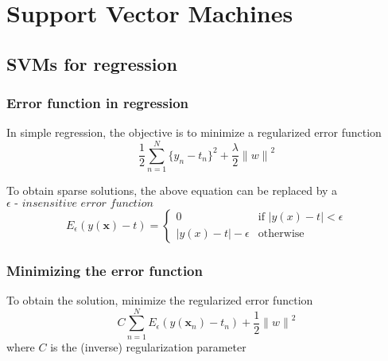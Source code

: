 \documentclass[t,14pt]{beamer}
\date[Introduction]{Support Vector Machines}
\begin{document}
\begin{frame}
  \titlepage
\end{frame}

\section{Support Vector Machines}


\subsection{SVMs for regression}

\begin{frame}
  \frametitle{Error function in regression}
  In simple regression, the objective is to minimize a regularized error 
  function
  \begin{equation}
    \frac{\displaystyle 1}{\displaystyle 2}
        \sum\limits_{n=1}^N \{y_n - t_n\}^2 + 
        \frac{\displaystyle \lambda}{\displaystyle 2}{\lVert w \rVert}^2
  \end{equation}

  To obtain sparse solutions, the above equation can be replaced by a 
  $\epsilon \textit{ - insensitive error function}$
  \begin{equation}
    E_\epsilon(y(\mathbf{x}) - t) = 
        \begin{cases}
            0 & \text{if } \lvert y(x) - t \rvert < \epsilon \\
            \lvert y(x) - t \rvert - \epsilon & \text{otherwise}
        \end{cases}
  \end{equation}
\end{frame}

\begin{frame}
  \frametitle{Minimizing the error function}
  To obtain the solution, minimize the regularized error function
  \begin{equation}
    C \sum\limits_{n=1}^N E_\epsilon(y(\mathbf{x}_n) - t_n) + 
      \frac{\displaystyle 1}{\displaystyle 2}{\lVert w \rVert}^2
  \end{equation} 
  where $C$ is the (inverse) regularization parameter
\end{frame}
\end{document}
